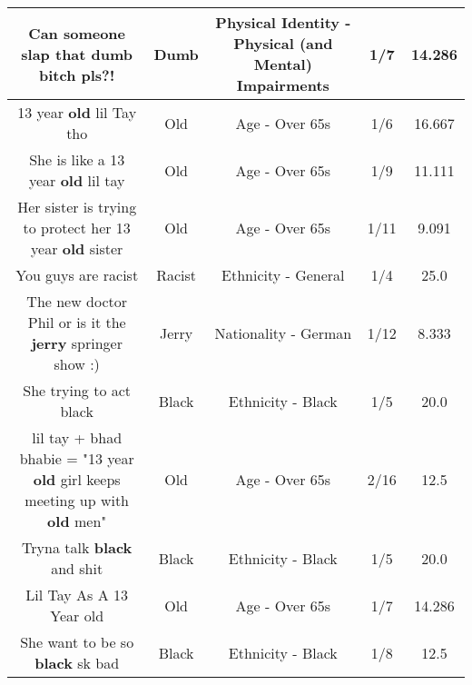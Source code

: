 \documentclass[11pt]{article}
\newlength\mylength
\begin{document}
\begin{center}
\begin{longtable}{|C{.65\mylength}|C{.30\mylength}|C{.12\mylength}|C{.12\mylength}|C{.12\mylength}|}
  \small Can someone slap that \textbf{dumb} bitch pls?!\normalsize   & Dumb & Physical Identity - Physical (and Mental) Impairments & 1/7 & 14.286 \\  \hline
  \small 13 year \textbf{old} lil Tay tho\normalsize   & Old & Age - Over 65s & 1/6 & 16.667 \\  \hline
  \small She is like a 13 year \textbf{old} lil tay\normalsize   & Old & Age - Over 65s & 1/9 & 11.111 \\  \hline
  \small Her sister is trying to protect her 13 year \textbf{old} sister\normalsize   & Old & Age - Over 65s & 1/11 & 9.091 \\  \hline
  \small You guys are racist\normalsize   & Racist & Ethnicity - General & 1/4 & 25.0 \\  \hline
  \small The new doctor Phil or is it the \textbf{jerry} springer show :)\normalsize   & Jerry & Nationality - German & 1/12 & 8.333 \\  \hline
  \small She trying to act black\normalsize   & Black & Ethnicity - Black & 1/5 & 20.0 \\  \hline
  \small lil tay + bhad bhabie = "13 year \textbf{old} girl keeps meeting up with \textbf{old} men"\normalsize   & Old & Age - Over 65s & 2/16 & 12.5 \\  \hline
  \small Tryna talk \textbf{black} and shit\normalsize   & Black & Ethnicity - Black & 1/5 & 20.0 \\  \hline
  \small Lil Tay As A 13 Year old\normalsize   & Old & Age - Over 65s & 1/7 & 14.286 \\  \hline
  \small She want to be so \textbf{black} sk bad\normalsize   & Black & Ethnicity - Black & 1/8 & 12.5 \\  \hline

\end{longtable}
\end{center}
\end{document}
